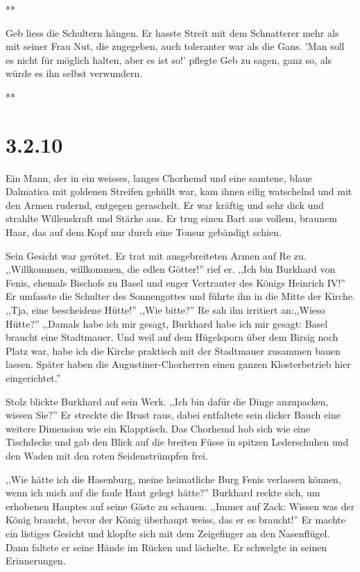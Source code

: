 \documentclass[11pt,titlepage,a5paper]{book}
\newcommand{\sterne}{\par{\centering ***\par}}
\begin{document}
\sterne

Geb liess die Schultern hängen. Er hasste Streit mit dem Schnatterer mehr als mit seiner Frau Nut, die zugegeben, auch toleranter war als die Gans. 'Man soll es nicht für möglich halten, aber es ist so!' pflegte Geb zu sagen, ganz so, als würde es ihn selbst verwundern.

\sterne




















\section*{3.2.10}

Ein Mann, der in ein weisses, langes Chorhemd und eine samtene, blaue Dalmatica mit goldenen Streifen gehüllt war, kam ihnen eilig watschelnd und mit den Armen rudernd, entgegen geraschelt. Er war kräftig und sehr dick und strahlte Willenskraft und Stärke aus. Er trug einen Bart aus vollem, braunem Haar, das auf dem Kopf nur durch eine Tonsur gebändigt schien.

Sein Gesicht war gerötet. Er trat mit ausgebreiteten Armen auf Re zu. ,,Willkommen, willkommen, die edlen Götter!'' rief er. ,,Ich bin Burkhard von Fenis, ehemals Bischofs zu Basel und enger Vertrauter des Königs Heinrich IV!'' Er umfasste die Schulter des Sonnengottes und führte ihn in die Mitte der Kirche. ,,Tja, eine bescheidene Hütte!'' ,,Wie bitte?'' Re sah ihn irritiert an:,,Wieso Hütte?'' ,,Damals habe ich mir gesagt, Burkhard habe ich mir gesagt: Basel braucht eine Stadtmauer. Und weil auf dem Hügelsporn über dem Birsig noch Platz war, habe ich die Kirche praktisch mit der Stadtmauer zusammen bauen lassen. Später haben die Augustiner-Chorherren einen ganzen Klosterbetrieb hier eingerichtet.''

Stolz blickte Burkhard auf sein Werk. ,,Ich bin dafür die Dinge anzupacken, wissen Sie?'' Er streckte die Brust raus, dabei entfaltete sein dicker Bauch eine weitere Dimension wie ein Klapptisch. Das Chorhemd hob sich wie eine Tischdecke und gab den Blick auf die breiten Füsse in spitzen Lederschuhen und den Waden mit den roten Seidenstrümpfen frei. 

,,Wie hätte ich die Hasenburg, meine heimatliche Burg Fenis verlassen können, wenn ich mich auf die faule Haut gelegt hätte?'' Burkhard reckte sich, um erhobenen Hauptes auf seine Gäste zu schauen. ,,Immer auf Zack: Wissen was der König braucht, bevor der König überhaupt weiss, das er es braucht!'' Er machte ein listiges Gesicht und klopfte sich mit dem Zeigefinger an den Nasenflügel. Dann faltete er seine Hände im Rücken und lächelte. Er schwelgte in seinen Erinnerungen.
\end{document}
